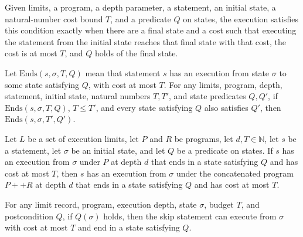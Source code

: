 \begin{definition}
\label{Light.Ends}
\leanok
{}
Given limits, a program, a depth parameter, a statement, an initial state, a
natural-number cost bound $T$, and a predicate $Q$ on states, the execution satisfies
this condition exactly when there are a final state and a cost such that executing the
statement from the initial state reaches that final state with that cost, the cost is at
most $T$, and $Q$ holds of the final state.
\end{definition}

\begin{theorem}
\label{Light.Ends.mono}
\leanok
{}
Let $\mathrm{Ends}(s,\sigma,T,Q)$ mean that statement $s$ has an execution from state
$\sigma$ to some state satisfying $Q$, with cost at most $T$. For any limits, program,
depth, statement, initial state, natural numbers $T,T'$, and state predicates $Q,Q'$, if
$\mathrm{Ends}(s,\sigma,T,Q)$, $T\le T'$, and every state satisfying $Q$ also satisfies
$Q'$, then $\mathrm{Ends}(s,\sigma,T',Q')$.
\end{theorem}

\begin{theorem}
\label{Light.Ends.append}
\leanok
{}
Let $L$ be a set of execution limits, let $P$ and $R$ be programs, let
$d,T\in\mathbb{N}$, let $s$ be a statement, let $\sigma$ be an initial state, and let
$Q$ be a predicate on states. If $s$ has an execution from $\sigma$ under $P$ at depth
$d$ that ends in a state satisfying $Q$ and has cost at most $T$, then $s$ has an
execution from $\sigma$ under the concatenated program $P++R$ at depth $d$ that ends in
a state satisfying $Q$ and has cost at most $T$.
\end{theorem}

\begin{theorem}
\label{Light.Ends.skip}
\leanok
{}
For any limit record, program, execution depth, state $\sigma$, budget $T$, and
postcondition $Q$, if $Q(\sigma)$ holds, then the skip statement can execute from
$\sigma$ with cost at most $T$ and end in a state satisfying $Q$.
\end{theorem}

